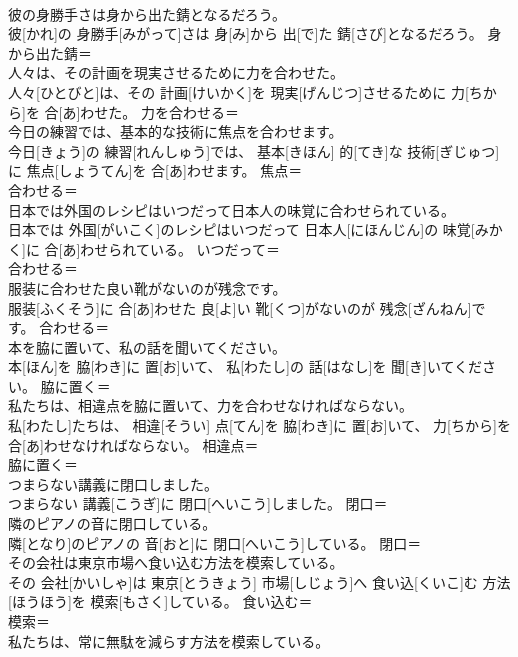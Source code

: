 \documentclass[8pt]{extreport}
\begin{document}
\begin{CJK}{UTF8}{min}
\\	彼の身勝手さは身から出た錆となるだろう。	
\\	彼[かれ]の 身勝手[みがって]さは 身[み]から 出[で]た 錆[さび]となるだろう。	身から出た錆＝ 
\\	人々は、その計画を現実させるために力を合わせた。	
\\	人々[ひとびと]は、その 計画[けいかく]を 現実[げんじつ]させるために 力[ちから]を 合[あ]わせた。	力を合わせる＝ 
\\	今日の練習では、基本的な技術に焦点を合わせます。	
\\	今日[きょう]の 練習[れんしゅう]では、 基本[きほん] 的[てき]な 技術[ぎじゅつ]に 焦点[しょうてん]を 合[あ]わせます。	焦点＝ 
\\	合わせる＝ 
\\	日本では外国のレシピはいつだって日本人の味覚に合わせられている。	
\\	日本では 外国[がいこく]のレシピはいつだって 日本人[にほんじん]の 味覚[みかく]に 合[あ]わせられている。	いつだって＝ 
\\	合わせる＝ 
\\	服装に合わせた良い靴がないのが残念です。	
\\	服装[ふくそう]に 合[あ]わせた 良[よ]い 靴[くつ]がないのが 残念[ざんねん]です。	合わせる＝ 
\\	本を脇に置いて、私の話を聞いてください。	
\\	本[ほん]を 脇[わき]に 置[お]いて、 私[わたし]の 話[はなし]を 聞[き]いてください。	脇に置く＝ 
\\	私たちは、相違点を脇に置いて、力を合わせなければならない。	
\\	私[わたし]たちは、 相違[そうい] 点[てん]を 脇[わき]に 置[お]いて、 力[ちから]を 合[あ]わせなければならない。	相違点＝ 
\\	脇に置く＝ 
\\	つまらない講義に閉口しました。	
\\	つまらない 講義[こうぎ]に 閉口[へいこう]しました。	閉口＝ 
\\	隣のピアノの音に閉口している。	
\\	隣[となり]のピアノの 音[おと]に 閉口[へいこう]している。	閉口＝ 
\\	その会社は東京市場へ食い込む方法を模索している。	
\\	その 会社[かいしゃ]は 東京[とうきょう] 市場[しじょう]へ 食い込[くいこ]む 方法[ほうほう]を 模索[もさく]している。	食い込む＝ 
\\	模索＝ 
\\	私たちは、常に無駄を減らす方法を模索している。	

\end{CJK}
\end{document}
